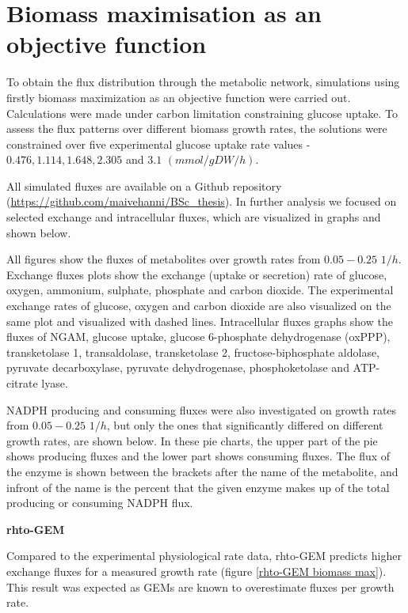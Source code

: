 \section{Biomass maximisation as an objective function}

To obtain the flux distribution through the metabolic network, simulations using firstly biomass maximization as an objective function were carried out.
Calculations were made under carbon limitation constraining glucose 
uptake. To assess the flux patterns over different biomass growth rates, the 
solutions were constrained over five experimental glucose uptake rate values - $0.476, 1.114, 1.648, 2.305$ and $3.1$ $(mmol/gDW/h)$.

All simulated fluxes are available on a Github repository (\url{https://github.com/maivehanni/BSc_thesis}). 
In further analysis we focused on selected exchange and intracellular fluxes, which are visualized in graphs and shown below.

All figures show the fluxes of metabolites over growth rates from $0.05 - 0.25$ $1/h$.
Exchange fluxes plots show the exchange (uptake or secretion) rate of glucose, oxygen, ammonium, sulphate, phosphate and carbon dioxide.
The experimental exchange rates of glucose, oxygen and carbon dioxide are also visualized on the same plot and visualized with dashed lines.
Intracellular fluxes graphs show the fluxes of NGAM, glucose uptake, glucose 6-phosphate dehydrogenase (oxPPP), transketolase 1, transaldolase, 
transketolase 2, 
fructose-biphosphate aldolase, pyruvate decarboxylase, pyruvate dehydrogenase, phosphoketolase and ATP-citrate lyase.

NADPH producing and consuming fluxes were also investigated on growth rates from $0.05 - 0.25$ $1/h$, but only the ones that significantly differed on 
different growth rates, are shown below. In these pie charts, the upper part of the pie shows producing fluxes and the lower part shows consuming fluxes.
The flux of the enzyme is shown between the brackets after the name of the metabolite, and infront of the name is the percent
that the given enzyme makes up of the total producing or consuming NADPH flux.


\textbf{rhto-GEM}

Compared to the experimental physiological rate data, rhto-GEM predicts higher exchange fluxes for a measured growth rate (figure \ref{rhto-GEM biomass max}).
This result was expected as GEMs are known to overestimate fluxes per growth rate.


